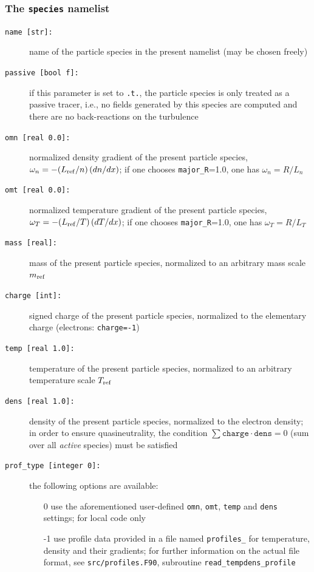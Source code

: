 \documentclass[12pt]{article}
\begin{document}
\subsubsection{{The \texttt{species} namelist}}
\hypertarget{species_nml}{}
\begin{description}
\item[\texttt{name [str]:}] name of the particle species in the present namelist (may be chosen freely)
\item[\texttt{passive [bool f]:}] if this parameter is set to \texttt{.t.}, the particle species is
only treated as a passive tracer, i.e., no fields generated by this species are computed and 
there are no back-reactions on the turbulence
\item[\texttt{omn [real 0.0]:}] normalized density gradient of the present particle species,
  $\omega_n=-(L_{\rm ref}/n)\,(dn/dx)$; if one chooses \texttt{major\_R}=1.0, one has $\omega_n=R/L_n$
\item[\texttt{omt [real 0.0]:}] normalized temperature gradient of the present particle species,
  $\omega_T=-(L_{\rm ref}/T)\,(dT/dx)$; if one chooses \texttt{major\_R}=1.0, one has $\omega_T=R/L_T$
\item[\texttt{mass [real]:}] mass of the present particle species, normalized to an arbitrary mass scale $m_{\rm ref}$
\item[\texttt{charge [int]:}] signed charge of the present particle species, normalized to the elementary charge
  (electrons: \texttt{charge=-1})
\item[\texttt{temp [real 1.0]:}] temperature of the present particle species, normalized to an arbitrary temperature
scale $T_{\rm ref}$
\item[\texttt{dens [real 1.0]:}] density of the present particle species, normalized to the electron density;
in order to ensure quasineutrality, the condition $\sum \texttt{charge}\cdot\texttt{dens}=0$ (sum over all
{\em active} species) must be satisfied
\item[\hypertarget{prof_type}{\tt prof\_type [integer 0]:}] the following options are available:
\begin{itemize}
 \item[0] use the aforementioned user-defined \texttt{omn}, \texttt{omt}, \texttt{temp} and \texttt{dens} settings; for local code only
 \item[-1] use profile data provided in a file named \texttt{profiles\_<species name>} 
  for temperature, density and their gradients; for further information on the actual file format,
  see \texttt{src/profiles.F90}, subroutine \texttt{read\_tempdens\_profile}

\end{itemize}
\end{description}
\end{document}
